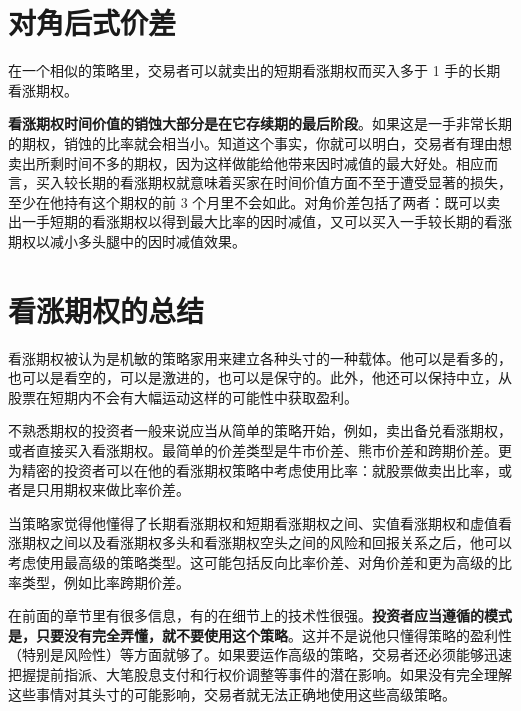 \documentclass{article}
\begin{document}
\section{对角后式价差}
在一个相似的策略里，交易者可以就卖出的短期看涨期权而买入多于 1 手的长期看涨期权。

\textbf{看涨期权时间价值的销蚀大部分是在它存续期的最后阶段}。如果这是一手非常长期的期权，销蚀的比率就会相当小。知道这个事实，你就可以明白，交易者有理由想卖出所剩时间不多的期权，因为这样做能给他带来因时减值的最大好处。相应而言，买入较长期的看涨期权就意味着买家在时间价值方面不至于遭受显著的损失，至少在他持有这个期权的前 3 个月里不会如此。对角价差包括了两者：既可以卖出一手短期的看涨期权以得到最大比率的因时减值，又可以买入一手较长期的看涨期权以减小多头腿中的因时减值效果。
\section{看涨期权的总结}
看涨期权被认为是机敏的策略家用来建立各种头寸的一种载体。他可以是看多的，也可以是看空的，可以是激进的，也可以是保守的。此外，他还可以保持中立，从股票在短期内不会有大幅运动这样的可能性中获取盈利。

不熟悉期权的投资者一般来说应当从简单的策略开始，例如，卖出备兑看涨期权，或者直接买入看涨期权。最简单的价差类型是牛市价差、熊市价差和跨期价差。更为精密的投资者可以在他的看涨期权策略中考虑使用比率：就股票做卖出比率，或者是只用期权来做比率价差。

当策略家觉得他懂得了长期看涨期权和短期看涨期权之间、实值看涨期权和虚值看涨期权之间以及看涨期权多头和看涨期权空头之间的风险和回报关系之后，他可以考虑使用最高级的策略类型。这可能包括反向比率价差、对角价差和更为高级的比率类型，例如比率跨期价差。

在前面的章节里有很多信息，有的在细节上的技术性很强。\textbf{投资者应当遵循的模式是，只要没有完全弄懂，就不要使用这个策略}。这并不是说他只懂得策略的盈利性（特别是风险性）等方面就够了。如果要运作高级的策略，交易者还必须能够迅速把握提前指派、大笔股息支付和行权价调整等事件的潜在影响。如果没有完全理解这些事情对其头寸的可能影响，交易者就无法正确地使用这些高级策略。
\end{document}
